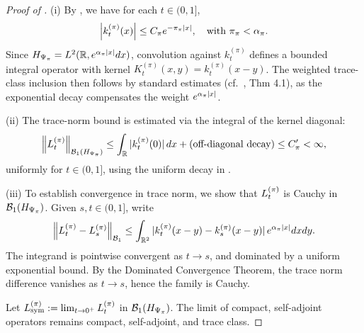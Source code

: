 \begin{proof}[Proof of ]
\leavevmode

(i) By , we have for each \( t \in (0,1] \),
\[
\left|k_t^{(\pi)}(x)\right| \leq C_\pi e^{-\pi_\pi |x|}, \quad \text{with } \pi_\pi < \alpha_{\pi}.
\]
Since \( H_{\Psi_{\pi}} = L^2(\mathbb{R}, e^{\alpha_{\pi} |x|} dx) \), convolution against \( k_t^{(\pi)} \) defines a bounded integral operator with kernel \( K_t^{(\pi)}(x, y) = k_t^{(\pi)}(x - y) \). The weighted trace-class inclusion then follows by standard estimates (cf.\ \cite{Simon2005TraceIdeals}, Thm 4.1), as the exponential decay compensates the weight \( e^{\alpha_{\pi} |x|} \).

(ii) The trace-norm bound is estimated via the integral of the kernel diagonal:
\[
\left\|L_t^{(\pi)}\right\|_{\mathcal{B}_1(H_{\Psi_{\pi}})} \leq \int_{\mathbb{R}} |k_t^{(\pi)}(0)| \, dx + \text{(off-diagonal decay)} \leq C_\pi' < \infty,
\]
uniformly for \( t \in (0,1] \), using the uniform decay in .

(iii) To establish convergence in trace norm, we show that \( L_t^{(\pi)} \) is Cauchy in \( \mathcal{B}_1(H_{\Psi_{\pi}}) \). Given \( s, t \in (0,1] \), write
\[
\left\|L_t^{(\pi)} - L_s^{(\pi)}\right\|_{\mathcal{B}_1} \leq \int_{\mathbb{R}^2} |k_t^{(\pi)}(x - y) - k_s^{(\pi)}(x - y)| \, e^{\alpha_{\pi} |x|} dx dy.
\]
The integrand is pointwise convergent as \( t \to s \), and dominated by a uniform exponential bound. By the Dominated Convergence Theorem, the trace norm difference vanishes as \( t \to s \), hence the family is Cauchy.

Let \( L_{\mathrm{sym}}^{(\pi)} := \lim_{t \to 0^+} L_t^{(\pi)} \) in \( \mathcal{B}_1(H_{\Psi_{\pi}}) \). The limit of compact, self-adjoint operators remains compact, self-adjoint, and trace class.
\end{proof}